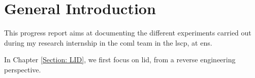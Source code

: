\chapter{General Introduction}

This progress report aims at documenting the different experiments carried out during my research internship in the \acrfull{coml} team in the \acrfull{lscp}, at \acrfull{ens}.

In Chapter \ref{Section: LID}, we first focus on \acrfull{lid}, from a reverse engineering perspective.